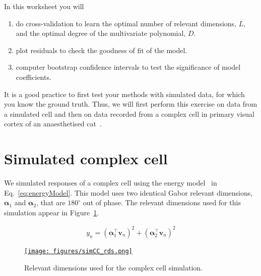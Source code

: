 \documentclass[12pt]{article}
\begin{document}
In this worksheet you will

\begin{enumerate}

    \item do cross-validation to learn the optimal number of relevant dimensions,
        $L$, and the optimal degree of the multivariate polynomial, $D$.

    \item plot residuals to check the goodness of fit of the model.

    \item computer bootstrap confidence intervals to test the significance of
        model coefficients.

\end{enumerate}

It is a good practice to first test your methods with simulated data, for which
you know the ground truth. Thus, we will first perform this exercise on data from a
simulated cell and then on data recorded from a complex cell in primary visual
cortex of an anaesthetised cat~\citep{felsenEtAl05}.

\section{Simulated complex cell}

We simulated responses of a complex cell using the energy
model~\citep{adelsonAndBergen85} in Eq.~\ref{eq:energyModel}. This model
uses two identical Gabor relevant dimensions, $\bm{\alpha}_1$ and
$\bm{\alpha}_2$, that are $180^\circ$ out of phase. The relevant dimensions used for this simulation appear in Figure~\ref{fig:rdsSim}.

\begin{align}
    y_n=(\bm{\alpha}_1^\intercal\mathbf{v}_n)^2+(\bm{\alpha}_2^\intercal\mathbf{v}_n)^2
    \label{eq:energyModel}
\end{align}

\begin{figure}[H]
    \begin{center}
        \href{https://www.gatsby.ucl.ac.uk/~rapela/neuroinformatics/2023/ws6/figures/simCC.html}{\texttt{[image: figures/simCC\_rds.png]}}

        \caption{Relevant dimensions used for the complex cell simulation.}

        \label{fig:rdsSim}
    \end{center}
\end{figure}
\end{document}
